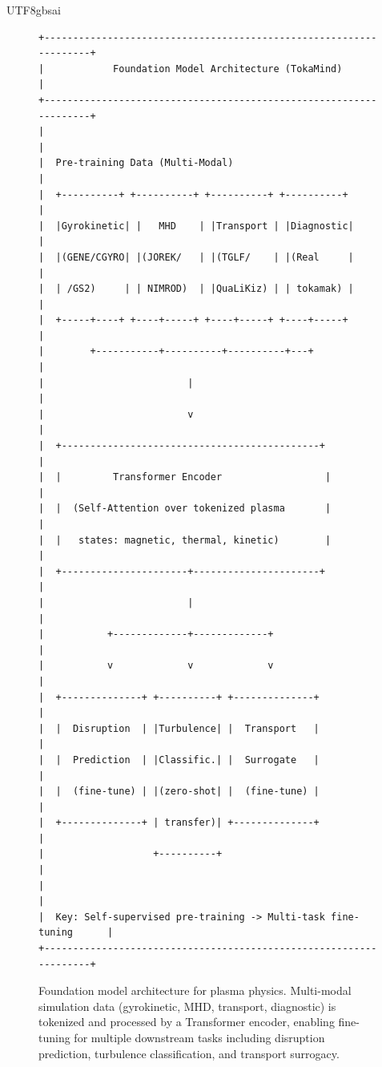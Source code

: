 \documentclass[12pt,a4paper]{article}
\begin{document}
\begin{CJK}{UTF8}{gbsai}
\begin{figure}[htbp]
\centering
\small
\begin{verbatim}
+-------------------------------------------------------------------+
|            Foundation Model Architecture (TokaMind)                |
+-------------------------------------------------------------------+
|                                                                   |
|  Pre-training Data (Multi-Modal)                                  |
|  +----------+ +----------+ +----------+ +----------+             |
|  |Gyrokinetic| |   MHD    | |Transport | |Diagnostic|             |
|  |(GENE/CGYRO| |(JOREK/   | |(TGLF/    | |(Real     |             |
|  | /GS2)     | | NIMROD)  | |QuaLiKiz) | | tokamak) |             |
|  +-----+----+ +----+-----+ +----+-----+ +----+-----+             |
|        +-----------+----------+----------+---+                    |
|                         |                                         |
|                         v                                         |
|  +---------------------------------------------+                 |
|  |         Transformer Encoder                  |                 |
|  |  (Self-Attention over tokenized plasma       |                 |
|  |   states: magnetic, thermal, kinetic)        |                 |
|  +----------------------+----------------------+                 |
|                         |                                         |
|           +-------------+-------------+                          |
|           v             v             v                           |
|  +--------------+ +----------+ +--------------+                   |
|  |  Disruption  | |Turbulence| |  Transport   |                   |
|  |  Prediction  | |Classific.| |  Surrogate   |                   |
|  |  (fine-tune) | |(zero-shot| |  (fine-tune) |                   |
|  +--------------+ | transfer)| +--------------+                   |
|                   +----------+                                    |
|                                                                   |
|  Key: Self-supervised pre-training -> Multi-task fine-tuning      |
+-------------------------------------------------------------------+
\end{verbatim}
\caption{Foundation model architecture for plasma physics. Multi-modal simulation data (gyrokinetic, MHD, transport, diagnostic) is tokenized and processed by a Transformer encoder, enabling fine-tuning for multiple downstream tasks including disruption prediction, turbulence classification, and transport surrogacy.}
\label{fig:foundation-model}
\end{figure}


\end{CJK}
\end{document}
